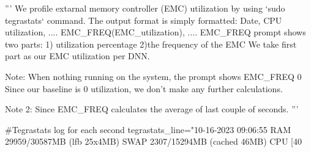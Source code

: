 '''
We profile extarnal memory controller (EMC) utilization by using `sudo tegrastats` command. 
The output format is simply formatted: Date, CPU utilization, .... EMC_FREQ(EMC_utilization), ....
EMC_FREQ prompt shows two parts: 1) utilization percentage 2)the frequency of the EMC
We take first part as our EMC utilization per DNN. 

Note: When nothing running on the system, the prompt shows EMC_FREQ 0%
Since our baseline is 0 utilization, we don't make any further calculations.

Note 2: Since EMC_FREQ calculates the average of last couple of seconds. 
'''

#Tegrastats log for each second
tegrastats_line="10-16-2023 09:06:55 RAM 29959/30587MB (lfb 25x4MB) SWAP 2307/15294MB (cached 46MB) CPU [40%
